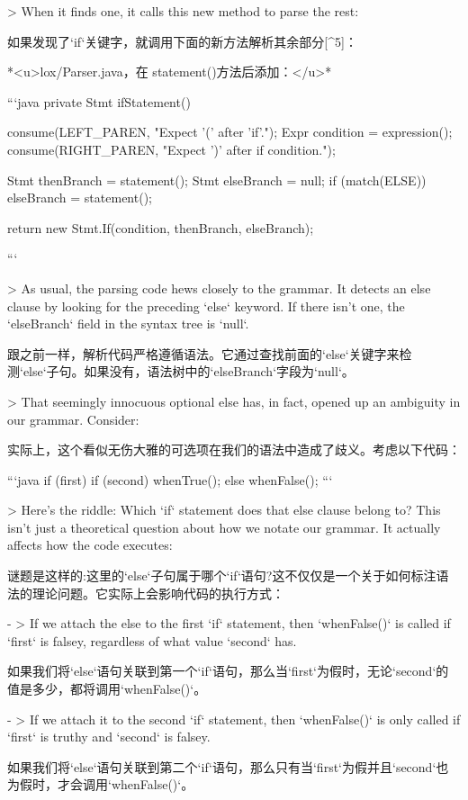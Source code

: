 \documentclass[cn,11pt,chinese]{elegantbook}
\begin{document}
{{> When it finds one, it calls this new method to parse the rest:

如果发现了`if`关键字，就调用下面的新方法解析其余部分[^5]：

*<u>lox/Parser.java，在 statement()方法后添加：</u>*

```java
  private Stmt ifStatement() {
    consume(LEFT_PAREN, "Expect '(' after 'if'.");
    Expr condition = expression();
    consume(RIGHT_PAREN, "Expect ')' after if condition."); 

    Stmt thenBranch = statement();
    Stmt elseBranch = null;
    if (match(ELSE)) {
      elseBranch = statement();
    }

    return new Stmt.If(condition, thenBranch, elseBranch);
  }
```

> As usual, the parsing code hews closely to the grammar. It detects an else clause by looking for the preceding `else` keyword. If there isn’t one, the `elseBranch` field in the syntax tree is `null`.

跟之前一样，解析代码严格遵循语法。它通过查找前面的`else`关键字来检测`else`子句。如果没有，语法树中的`elseBranch`字段为`null`。

> That seemingly innocuous optional else has, in fact, opened up an ambiguity in our grammar. Consider:

实际上，这个看似无伤大雅的可选项在我们的语法中造成了歧义。考虑以下代码：

```java
if (first) if (second) whenTrue(); else whenFalse();
```

> Here’s the riddle: Which `if` statement does that else clause belong to? This isn’t just a theoretical question about how we notate our grammar. It actually affects how the code executes:

谜题是这样的:这里的`else`子句属于哪个`if`语句?这不仅仅是一个关于如何标注语法的理论问题。它实际上会影响代码的执行方式：

- > If we attach the else to the first `if` statement, then `whenFalse()` is called if `first` is falsey, regardless of what value `second` has.

  如果我们将`else`语句关联到第一个`if`语句，那么当`first`为假时，无论`second`的值是多少，都将调用`whenFalse()`。

- > If we attach it to the second `if` statement, then `whenFalse()` is only called if `first` is truthy and `second` is falsey.

  如果我们将`else`语句关联到第二个`if`语句，那么只有当`first`为假并且`second`也为假时，才会调用`whenFalse()`。

}}
\end{document}
